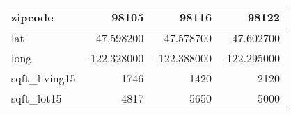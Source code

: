 \begin{table}[H]
\begin{tabular}{|l|r|r|r|}
\hline zipcode & \cellcolor[rgb]{0.9, 0.54, 0.52} 98105 & 98116 & 98122 \\
\hline lat & \cellcolor[rgb]{0.9, 0.54, 0.52} 47.598200 & 47.578700 & 47.602700 \\
\hline long & \cellcolor[rgb]{0.9, 0.54, 0.52} -122.328000 & \cellcolor[rgb]{0.9, 0.54, 0.52} -122.388000 & \cellcolor[rgb]{0.9, 0.54, 0.52} -122.295000 \\
\hline sqft\_living15 & \cellcolor[rgb]{0.9, 0.54, 0.52} 1746 & 1420 & 2120 \\
\hline sqft\_lot15 & \cellcolor[rgb]{0.9, 0.54, 0.52} 4817 & 5650 & 5000 \\
\hline
\end{tabular}
\end{table}
